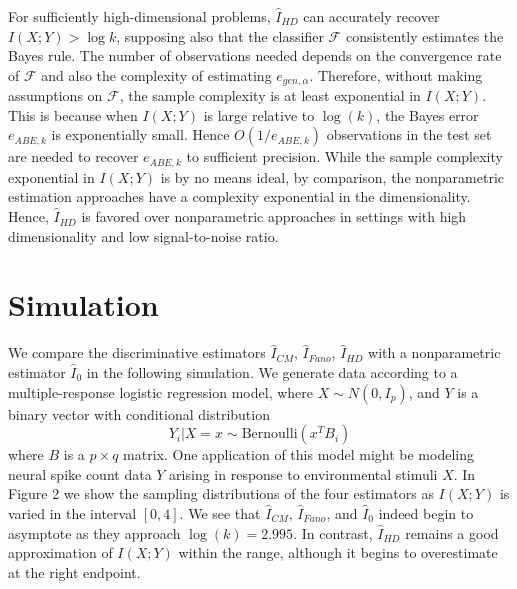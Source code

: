 \documentclass{article}
\begin{document}
For sufficiently high-dimensional problems, $\hat{I}_{HD}$ can accurately recover $I(X; Y) > \log k$,
supposing also that the classifier $\mathcal{F}$ consistently estimates the Bayes rule.
The number of observations needed depends on the convergence rate of $\mathcal{F}$
and also the complexity of estimating $e_{gen, \alpha}$.  Therefore, without making assumptions on $\mathcal{F}$, the sample complexity is at least exponential in $I(X; Y)$.
This is because when $I(X; Y)$ is large relative to $\log(k)$, the Bayes error $e_{ABE, k}$ is exponentially small.  Hence $O(1/e_{ABE, k})$ observations in the test set are needed to recover $e_{ABE, k}$ to sufficient precision.  While the sample complexity exponential in $I(X; Y)$ is by no means ideal,
by comparison, the nonparametric estimation approaches have a complexity exponential in the dimensionality.  Hence, $\hat{I}_{HD}$ is favored over nonparametric approaches in settings
with high dimensionality and low signal-to-noise ratio.


\section{Simulation}

We compare the discriminative estimators $\hat{I}_{CM}$, $\hat{I}_{Fano}$, $\hat{I}_{HD}$
with a nonparametric estimator $\hat{I}_0$ in the following simulation.
We generate data according to a multiple-response logistic regression model, 
where
$
X \sim N(0, I_p)
$,
and $Y$ is a binary vector with conditional distribution
\[
Y_i|X = x \sim \text{Bernoulli}(x^T B_i)
\]
where $B$ is a $p \times q$ matrix. 
One application of this model might be modeling neural spike count data $Y$ arising in response
to environmental stimuli $X$.
In Figure 2 we show the sampling distributions of the four estimators as $I(X; Y)$ is varied in the interval $[0, 4]$.  We see that $\hat{I}_{CM}$, $\hat{I}_{Fano}$, and $\hat{I}_0$ indeed begin to asymptote as they approach $\log(k) = 2.995$.  In contrast, $\hat{I}_{HD}$ remains a good approximation of $I(X; Y)$ within the range, although it begins to overestimate at the right endpoint.
\end{document}
